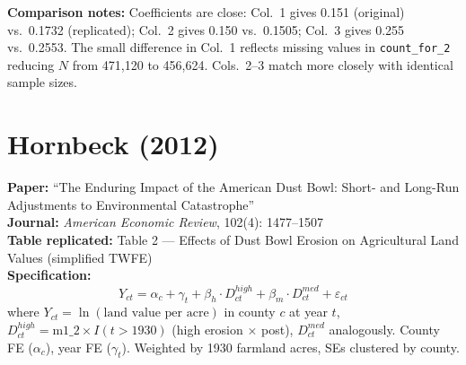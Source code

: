 \documentclass[11pt,a4paper]{article}
\begin{document}
\vspace{1cm}
\textbf{Comparison notes:} Coefficients are close: Col.\ 1 gives 0.151 (original) vs.\ 0.1732 (replicated); Col.\ 2 gives 0.150 vs.\ 0.1505; Col.\ 3 gives 0.255 vs.\ 0.2553. The small difference in Col.\ 1 reflects missing values in \texttt{count\_for\_2} reducing $N$ from 471,120 to 456,624. Cols.\ 2--3 match more closely with identical sample sizes.

\newpage

\section{Hornbeck (2012)}

\textbf{Paper:} ``The Enduring Impact of the American Dust Bowl: Short- and Long-Run Adjustments to Environmental Catastrophe''\\
\textbf{Journal:} \textit{American Economic Review}, 102(4): 1477--1507\\
\textbf{Table replicated:} Table 2 --- Effects of Dust Bowl Erosion on Agricultural Land Values (simplified TWFE)\\
\textbf{Specification:}
\[
Y_{ct} = \alpha_c + \gamma_t + \beta_h \cdot D^{high}_{ct} + \beta_m \cdot D^{med}_{ct} + \varepsilon_{ct}
\]
where $Y_{ct} = \ln(\text{land value per acre})$ in county $c$ at year $t$, $D^{high}_{ct} = \text{m1\_2} \times I(t > 1930)$ (high erosion $\times$ post), $D^{med}_{ct}$ analogously. County FE ($\alpha_c$), year FE ($\gamma_t$). Weighted by 1930 farmland acres, SEs clustered by county.

\vspace{0.3cm}
\noindent{}
\end{document}
